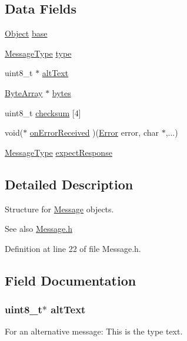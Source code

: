 \subsection*{Data Fields}
\begin{DoxyCompactItemize}
\item 
\hyperlink{struct_m_i_object}{Object} \hyperlink{struct_m_i_message_ad0814be49cef65d1662b278c4c591509}{base}
\item 
\hyperlink{_m_i_constants_8h_aa6ba957da4da60695d0c8ae85975212a}{MessageType} \hyperlink{struct_m_i_message_a98cad3c21d5a8a679befe2557a5246be}{type}
\item 
uint8\_\-t $\ast$ \hyperlink{struct_m_i_message_ad4a1b71852a8721ee4be4f6aaacd8566}{altText}
\item 
\hyperlink{struct_m_i_byte_array}{ByteArray} $\ast$ \hyperlink{struct_m_i_message_a8fb493ee3c32dd3a9fb29bc71c852f86}{bytes}
\item 
uint8\_\-t \hyperlink{struct_m_i_message_a02d93e565ee31bda6e0211dca9b42be5}{checksum} \mbox{[}4\mbox{]}
\item 
void($\ast$ \hyperlink{struct_m_i_message_aeb0776cff292839518da5f5a48884fd9}{onErrorReceived} )(\hyperlink{_m_i_constants_8h_a78789cd8e7333545dd73768531261968}{Error} error, char $\ast$,...)
\item 
\hyperlink{_m_i_constants_8h_aa6ba957da4da60695d0c8ae85975212a}{MessageType} \hyperlink{struct_m_i_message_ac9d8ec2cdfb3a4cc93366b3f5742f527}{expectResponse}
\end{DoxyCompactItemize}


\subsection{Detailed Description}
Structure for \hyperlink{struct_m_i_message}{Message} objects. 

\begin{DoxySeeAlso}{See also}
\hyperlink{_m_i_message_8h}{Message.h} 
\end{DoxySeeAlso}


Definition at line 22 of file Message.h.



\subsection{Field Documentation}
\hypertarget{struct_m_i_message_ad4a1b71852a8721ee4be4f6aaacd8566}{
\subsubsection[{altText}]{\setlength{\rightskip}{0pt plus 5cm}uint8\_\-t$\ast$ {\bf altText}}}
\label{struct_m_i_message_ad4a1b71852a8721ee4be4f6aaacd8566}
For an alternative message: This is the type text. 

